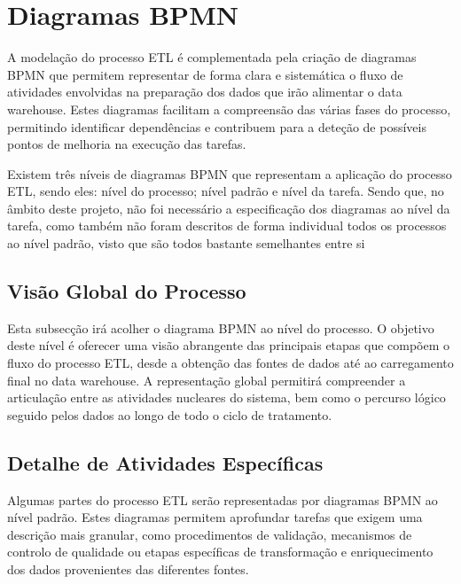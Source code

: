 \section{Diagramas BPMN}

A modelação do processo ETL é complementada pela criação de diagramas BPMN que permitem representar de forma clara e sistemática o fluxo de atividades envolvidas na preparação dos dados que irão alimentar o data warehouse. Estes diagramas facilitam a compreensão das várias fases do processo, permitindo identificar dependências e contribuem para a deteção de possíveis pontos de melhoria na execução das tarefas.

Existem três níveis de diagramas BPMN que representam a aplicação do processo ETL, sendo eles: nível do processo; nível padrão e nível da tarefa. Sendo que, no âmbito deste projeto, não foi necessário a especificação dos diagramas ao nível da tarefa, como também não foram descritos de forma individual todos os processos ao nível padrão, visto que são todos bastante semelhantes entre si 

\subsection{Visão Global do Processo}

Esta subsecção irá acolher o diagrama BPMN ao nível do processo. O objetivo deste nível é oferecer uma visão abrangente das principais etapas que compõem o fluxo do processo ETL, desde a obtenção das fontes de dados até ao carregamento final no data warehouse. A representação global permitirá compreender a articulação entre as atividades nucleares do sistema, bem como o percurso lógico seguido pelos dados ao longo de todo o ciclo de tratamento.


\subsection{Detalhe de Atividades Específicas}

Algumas partes do processo ETL serão representadas por diagramas BPMN ao nível padrão. Estes diagramas permitem aprofundar tarefas que exigem uma descrição mais granular, como procedimentos de validação, mecanismos de controlo de qualidade ou etapas específicas de transformação e enriquecimento dos dados provenientes das diferentes fontes.

